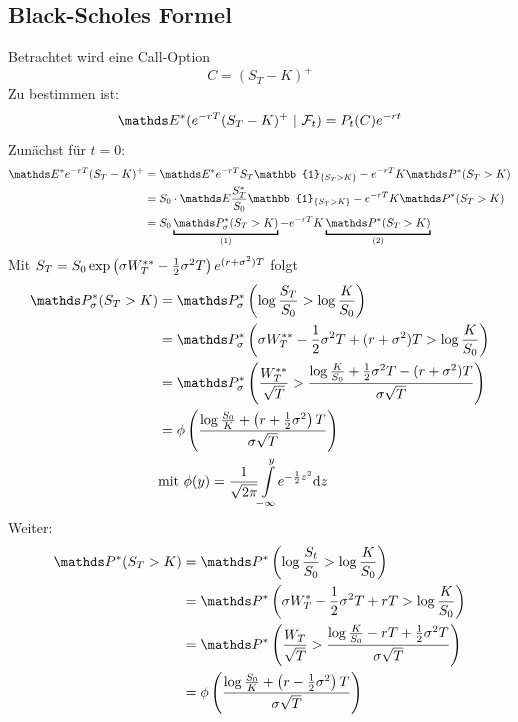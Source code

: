 \subsection{Black-Scholes Formel}
\label{sub:black_scholes_formel}
Betrachtet wird eine Call-Option
\[
C=(S_T-K)^+
\]
Zu bestimmen ist:
\[
\E^*(e^{-rT}(S_T-K)^+~|~\F_t)=P_t(C)e^{-rt}
\]
Zunächst für $t=0$:
\begin{equation*}
\begin{aligned}
	\E^*e^{-rT}(S_T-K)^+ &= \E^*e^{-rT}S_T\mathbb{1}_{\penbrace{S_T>K}}-e^{-rT}K\Pw^*(S_T>K)\\
	&= S_0\cdot \E\frac{S_T^*}{S_0}\mathbb{1}_{\penbrace{S_T>K}}-e^{-rT}K\Pw^*(S_T>K)\\
	&= S_0\underbracket{\Pw_\sigma^*(S_T>K)}_{(1)}-e^{-rT}K\underbracket{\Pw^*(S_T>K)}_{(2)}\\
\end{aligned}
\end{equation*}
Mit $S_T=S_0\exp\left( \sigma W_T^{**}-\frac{1}{2}\sigma^2 T\right)e^{(r+\sigma^2)T}$ folgt
\begin{equation*}
\begin{aligned}
	\Pw_\sigma^*(S_T>K) &= \Pw_\sigma^*\enbrace{\log\frac{S_T}{S_0}>\log\frac{K}{S_0}}\\
	&= \Pw_\sigma^*\enbrace{\sigma W_T^{**}-\frac{1}{2}\sigma^2 T+(r+\sigma^2)T>\log\frac{K}{S_0}}\\
	&= \Pw_\sigma^*\enbrace{\frac{W_T^{**}}{\sqrt{T}}>\frac{\log\frac{K}{S_0}+\frac{1}{2}\sigma^2T-(r+\sigma^2)T}{\sigma\sqrt{T}}}\\
	&= \phi\enbrace{\frac{\log\frac{S_0}{K}+\enbrace{r+\frac{1}{2}\sigma^2}T}{\sigma\sqrt{T}}}\\
	&\text{mit } \phi(y)=\frac{1}{\sqrt{2\pi}}\int\ablim{-\infty}^ye^{-\frac{1}{2}z^2}\dint z
\end{aligned}
\end{equation*}
Weiter:
\begin{equation*}
\begin{aligned}
	\Pw^*(S_T>K) &= \Pw^*\enbrace{\log\frac{S_t}{S_0}>\log\frac{K}{S_0}}\\
	&= \Pw^*\enbrace{\sigma W_T^*-\frac{1}{2}\sigma^2T+rT>\log\frac{K}{S_0}}\\
	&= \Pw^*\enbrace{\frac{W_T}{\sqrt{T}}>\frac{\log\frac{K}{S_0}-rT+\frac{1}{2}\sigma^2T}{\sigma\sqrt{T}}}\\
	&= \phi\enbrace{\frac{\log\frac{S_0}{K}+\enbrace{r-\frac{1}{2}\sigma^2}T}{\sigma\sqrt{T}}}
\end{aligned}
\end{equation*}
